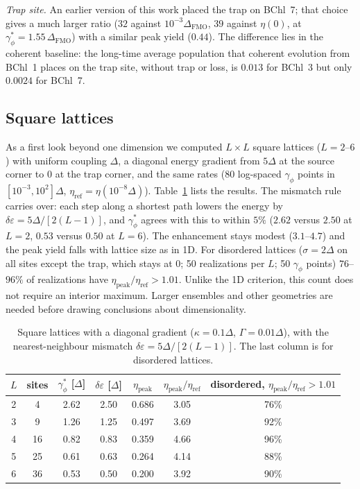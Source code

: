 \documentclass[aps,pre,preprint,floatfix]{revtex4-2}
\newcommand{\gp}{\gamma_\phi}
\newcommand{\gps}{\gamma_\phi^*}
\newcommand{\etap}{\eta_\text{peak}}
\newcommand{\etar}{\eta_\text{ref}}
\newcommand{\enh}{\etap/\etar}
\newcommand{\dE}{\delta\varepsilon}
\begin{document}
\textit{Trap site.}
An earlier version of this work placed the trap on BChl~7; that choice gives a
much larger ratio ($32$ against $10^{-3}\Delta_\text{FMO}$, $39$ against
$\eta(0)$, at $\gps=1.55\,\Delta_\text{FMO}$) with a similar peak yield
($0.44$).
The difference lies in the coherent baseline: the long-time average
population that coherent evolution from BChl~1 places on the trap site, without
trap or loss, is $0.013$ for BChl~3 but only $0.0024$ for BChl~7.

\subsection{\label{sec:2d}Square lattices}

As a first look beyond one dimension we computed $L\times L$ square lattices
($L=2$--$6$) with uniform coupling $\Delta$, a diagonal energy gradient from
$5\Delta$ at the source corner to $0$ at the trap corner, and the same rates
(80 log-spaced $\gp$ points in $[10^{-3},10^{2}]\Delta$,
$\etar=\eta(10^{-8}\Delta)$).
Table~\ref{tab:2d} lists the results.
The mismatch rule carries over: each step along a shortest path lowers the
energy by $\dE=5\Delta/[2(L-1)]$, and $\gps$ agrees with this to within $5\%$
($2.62$ versus $2.50$ at $L=2$, $0.53$ versus $0.50$ at $L=6$).
The enhancement stays modest ($3.1$--$4.7$) and the peak yield falls with
lattice size as in 1D.
For disordered lattices ($\sigma=2\Delta$ on all sites except the trap, which
stays at $0$; 50 realizations per $L$; 50 $\gp$ points) $76$--$96\%$ of
realizations have $\enh>1.01$.
Unlike the 1D criterion, this count does not require an interior maximum.
Larger ensembles and other geometries are needed before drawing conclusions
about dimensionality.

\begin{table}[htbp]
\caption{\label{tab:2d}Square lattices with a diagonal gradient
  ($\kappa=0.1\Delta$, $\Gamma=0.01\Delta$), with the nearest-neighbour
  mismatch $\dE=5\Delta/[2(L-1)]$.
  The last column is for disordered lattices.}
\begin{ruledtabular}
\begin{tabular}{ccccccc}
$L$ & sites & $\gps$ [$\Delta$] & $\dE$ [$\Delta$] & $\etap$ & $\enh$
  & disordered, $\enh>1.01$ \\
\hline
2 &  4 & 2.62 & 2.50 & 0.686 & 3.05 & 76\% \\
3 &  9 & 1.26 & 1.25 & 0.497 & 3.69 & 92\% \\
4 & 16 & 0.82 & 0.83 & 0.359 & 4.66 & 96\% \\
5 & 25 & 0.61 & 0.63 & 0.264 & 4.14 & 88\% \\
6 & 36 & 0.53 & 0.50 & 0.200 & 3.92 & 90\% \\
\end{tabular}
\end{ruledtabular}
\end{table}
\end{document}
